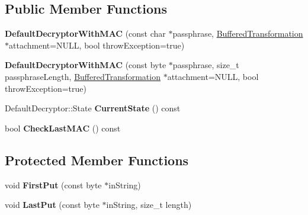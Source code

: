 \subsection*{Public Member Functions}
\begin{DoxyCompactItemize}
\item 
\hypertarget{class_default_decryptor_with_m_a_c_ab83261139931c1a86c404c30b1f343de}{
{\bfseries DefaultDecryptorWithMAC} (const char $\ast$passphrase, \hyperlink{class_buffered_transformation}{BufferedTransformation} $\ast$attachment=NULL, bool throwException=true)}
\label{class_default_decryptor_with_m_a_c_ab83261139931c1a86c404c30b1f343de}

\item 
\hypertarget{class_default_decryptor_with_m_a_c_a40ad312c0cd1c674051765581e28e997}{
{\bfseries DefaultDecryptorWithMAC} (const byte $\ast$passphrase, size\_\-t passphraseLength, \hyperlink{class_buffered_transformation}{BufferedTransformation} $\ast$attachment=NULL, bool throwException=true)}
\label{class_default_decryptor_with_m_a_c_a40ad312c0cd1c674051765581e28e997}

\item 
\hypertarget{class_default_decryptor_with_m_a_c_a6b0c8d4855de79b786b1158b171c257d}{
DefaultDecryptor::State {\bfseries CurrentState} () const }
\label{class_default_decryptor_with_m_a_c_a6b0c8d4855de79b786b1158b171c257d}

\item 
\hypertarget{class_default_decryptor_with_m_a_c_a67940a3de8dcd0c487fd049326a0b212}{
bool {\bfseries CheckLastMAC} () const }
\label{class_default_decryptor_with_m_a_c_a67940a3de8dcd0c487fd049326a0b212}

\end{DoxyCompactItemize}
\subsection*{Protected Member Functions}
\begin{DoxyCompactItemize}
\item 
\hypertarget{class_default_decryptor_with_m_a_c_acd1d748eb806de4cc27c7d8dedfabcd9}{
void {\bfseries FirstPut} (const byte $\ast$inString)}
\label{class_default_decryptor_with_m_a_c_acd1d748eb806de4cc27c7d8dedfabcd9}

\item 
\hypertarget{class_default_decryptor_with_m_a_c_ad9adeb4d5449e65de3ae460758ebe76d}{
void {\bfseries LastPut} (const byte $\ast$inString, size\_\-t length)}
\label{class_default_decryptor_with_m_a_c_ad9adeb4d5449e65de3ae460758ebe76d}

\end{DoxyCompactItemize}



